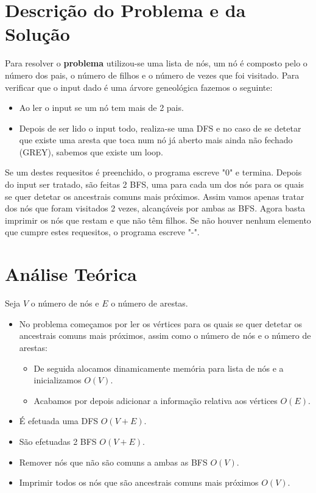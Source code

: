 \documentclass[12pt,a4paper]{article}
\begin{document}
  \section{Descrição do Problema e da Solução}

  Para resolver o \textbf{problema} utilizou-se uma lista de nós, um nó é composto pelo o número dos pais, o número de filhos e o número de vezes que foi visitado.
  Para verificar que o input dado é uma árvore geneológica fazemos o seguinte:
  
  \begin{itemize}
    \setlength{\itemsep}{0pt}
      \item Ao ler o input se um nó tem mais de 2 pais.
      \item Depois de ser lido o input todo, realiza-se uma DFS e no caso de se detetar que existe uma aresta que toca num nó já aberto mais ainda não fechado (GREY), sabemos que existe um loop.
  \end{itemize}

  Se um destes requesitos é preenchido, o programa escreve "0" e termina.
  Depois do input ser tratado, são feitas 2 BFS, uma para cada um dos nós para os quais se quer detetar os ancestrais comuns mais próximos.
  Assim vamos apenas tratar dos nós que foram visitados 2 vezes, alcançáveis por ambas as BFS.
  Agora basta imprimir os nós que restam e que não têm filhos.
  Se não houver nenhum elemento que cumpre estes requesitos, o programa escreve "-".

  \section{Análise Teórica}

  Seja $V$ o número de nós e $E$ o número de arestas.

  \begin{itemize}
    \setlength{\itemsep}{0pt}
    \item No problema começamos por ler os vértices para os quais se quer detetar os ancestrais comuns mais próximos, assim como o número de nós e o número de arestas:
    \begin{itemize}
      \setlength{\itemsep}{0pt}
      \item De seguida alocamos dinamicamente memória para lista de nós e a inicializamos $O(V)$.
      \item Acabamos por depois adicionar a informação relativa aos vértices $O(E)$.
    \end{itemize}

   \item É efetuada uma DFS $O(V + E)$.

  \item São efetuadas 2 BFS $O(V + E)$.

  \item Remover nós que não são comuns a ambas as BFS $O(V)$.

  \item Imprimir todos os nós que são ancestrais comuns mais próximos $O(V)$.
  \end{itemize}
\end{document}
